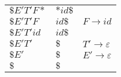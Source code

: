 \documentclass{standalone}
\providecommand\lightrule{%
	\arrayrulecolor{black!30}%
	\midrule[\lightrulewidth]%
	\arrayrulecolor{black}}
\begin{document}
\begin{tabularx}{\textwidth}{XXX}
        \(\$E'T'F \ast\)
        &
        \(* id\$\)
        &

        \\ \lightrule

        \(\$E'T'F\)
        &
        \(id\$\)
        &
        \(F \to id\)

        \\ \lightrule

        \(\$E'T'id\)
        &
        \(id\$\)
        &

        \\ \lightrule

        \(\$E'T'\)
        &
        \(\$\)
        &
        \(T' \to \varepsilon\)

        \\ \lightrule

        \(\$E'\)
        &
        \(\$\)
        &
        \(E' \to \varepsilon\)

        \\ \lightrule

        \(\$\)
        &
        \(\$\)
        &
        
        \\
\end{tabularx}
\end{document}

